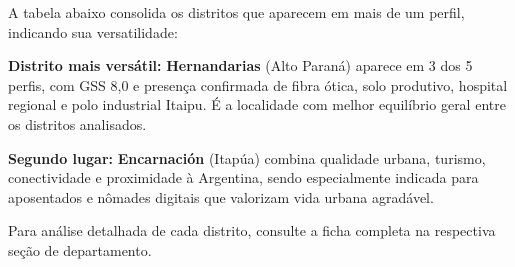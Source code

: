 A tabela abaixo consolida os distritos que aparecem em mais de um perfil, indicando sua versatilidade:

\begin{center}
\end{center}

\medskip

\textbf{Distrito mais versátil:} \textbf{Hernandarias} (Alto Paraná) aparece em 3 dos 5 perfis, com GSS 8,0 e presença confirmada de fibra ótica, solo produtivo, hospital regional e polo industrial Itaipu. É a localidade com melhor equilíbrio geral entre os distritos analisados.

\textbf{Segundo lugar:} \textbf{Encarnación} (Itapúa) combina qualidade urbana, turismo, conectividade e proximidade à Argentina, sendo especialmente indicada para aposentados e nômades digitais que valorizam vida urbana agradável.

\medskip
Para análise detalhada de cada distrito, consulte a ficha completa na respectiva seção de departamento.

\clearpage
